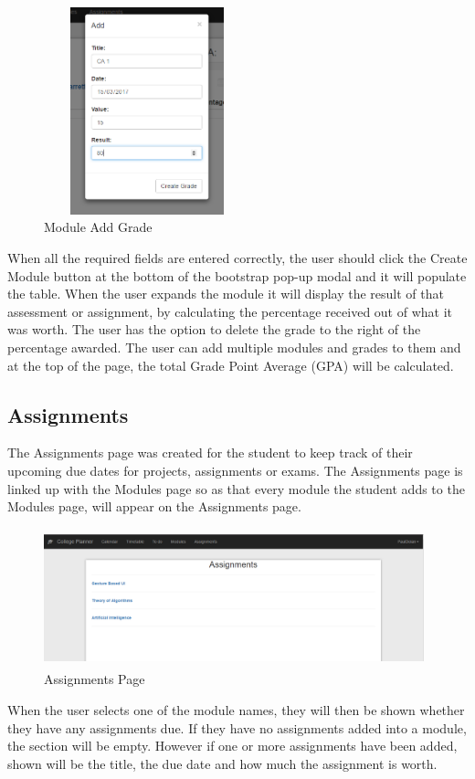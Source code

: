 \begin{figure}[h]
\centering
\includegraphics[width=6cm, height=6cm]{img/AddGrade}
\caption{Module Add Grade}
\label{fig:ModuleGrade}
\end{figure}
\newpage
When all the required fields are entered correctly, the user should click the Create Module button at the bottom of the bootstrap pop-up modal and it will populate the table. When the user expands the module it will display the result of that assessment or assignment, by calculating the percentage received out of what it was worth. The user has the option to delete the grade to the right of the percentage awarded. The user can add multiple modules and grades to them and at the top of the page, the total Grade Point Average (GPA) will be calculated.



\subsection{Assignments}
The Assignments page was created for the student to keep track of their upcoming due dates for projects, assignments or exams. The Assignments page is linked up with the Modules page so as that every module the student adds to the Modules page, will appear on the Assignments page. 

\begin{figure}[h]
\centering
\includegraphics[width=11cm, height=4cm]{img/Assignments}
\caption{Assignments Page}
\end{figure}
\newpage
When the user selects one of the module names, they will then be shown whether they have any assignments due. If they have no assignments added into a module, the section will be empty. However if one or more assignments have been added, shown will be the title, the due date and how much the assignment is worth.


